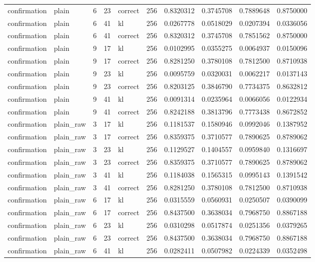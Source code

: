 \begin{tabular}{llrrlrrrrr}
confirmation & plain & 6 & 23 & correct & 256 & 0.8320312 & 0.3745708 & 0.7889648 & 0.8750000 \\
confirmation & plain & 6 & 41 & kl & 256 & 0.0267778 & 0.0518029 & 0.0207394 & 0.0336056 \\
confirmation & plain & 6 & 41 & correct & 256 & 0.8320312 & 0.3745708 & 0.7851562 & 0.8750000 \\
confirmation & plain & 9 & 17 & kl & 256 & 0.0102995 & 0.0355275 & 0.0064937 & 0.0150096 \\
confirmation & plain & 9 & 17 & correct & 256 & 0.8281250 & 0.3780108 & 0.7812500 & 0.8710938 \\
confirmation & plain & 9 & 23 & kl & 256 & 0.0095759 & 0.0320031 & 0.0062217 & 0.0137143 \\
confirmation & plain & 9 & 23 & correct & 256 & 0.8203125 & 0.3846790 & 0.7734375 & 0.8632812 \\
confirmation & plain & 9 & 41 & kl & 256 & 0.0091314 & 0.0235964 & 0.0066056 & 0.0122934 \\
confirmation & plain & 9 & 41 & correct & 256 & 0.8242188 & 0.3813796 & 0.7773438 & 0.8672852 \\
confirmation & plain_raw & 3 & 17 & kl & 256 & 0.1181537 & 0.1580946 & 0.0992046 & 0.1387952 \\
confirmation & plain_raw & 3 & 17 & correct & 256 & 0.8359375 & 0.3710577 & 0.7890625 & 0.8789062 \\
confirmation & plain_raw & 3 & 23 & kl & 256 & 0.1129527 & 0.1404557 & 0.0959840 & 0.1316697 \\
confirmation & plain_raw & 3 & 23 & correct & 256 & 0.8359375 & 0.3710577 & 0.7890625 & 0.8789062 \\
confirmation & plain_raw & 3 & 41 & kl & 256 & 0.1184038 & 0.1565315 & 0.0995143 & 0.1391542 \\
confirmation & plain_raw & 3 & 41 & correct & 256 & 0.8281250 & 0.3780108 & 0.7812500 & 0.8710938 \\
confirmation & plain_raw & 6 & 17 & kl & 256 & 0.0315559 & 0.0560931 & 0.0250507 & 0.0390099 \\
confirmation & plain_raw & 6 & 17 & correct & 256 & 0.8437500 & 0.3638034 & 0.7968750 & 0.8867188 \\
confirmation & plain_raw & 6 & 23 & kl & 256 & 0.0310298 & 0.0517874 & 0.0251356 & 0.0379265 \\
confirmation & plain_raw & 6 & 23 & correct & 256 & 0.8437500 & 0.3638034 & 0.7968750 & 0.8867188 \\
confirmation & plain_raw & 6 & 41 & kl & 256 & 0.0282411 & 0.0507982 & 0.0224339 & 0.0352498 \\

\end{tabular}
